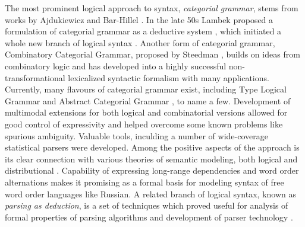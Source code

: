 \documentclass[a4paper]{article}
\theoremstyle{example-style}
\begin{document}
The most prominent logical approach to syntax, \textit{categorial grammar}, stems from works by Ajdukiewicz and Bar-Hillel \parencite{ajdukiewicz1935,bar1953quasi}. In the late 50s Lambek proposed a formulation of categorial grammar as a deductive system \parencite{lambek1958mathematics,lambek1961calculus}, which initiated a whole new branch of logical syntax \parencite{moot2012logic}. Another form of categorial grammar, Combinatory Categorial Grammar, proposed by Steedman \parencite{steedman2000syntactic}, builds on ideas from combinatory logic and has developed into a highly successful non-transformational lexicalized syntactic formalism with many applications. Currently, many flavours of categorial grammar exist, including Type Logical Grammar \parencite{morrill1994type} and Abstract Categorial Grammar \parencite{degroot2001towards}, to name a few. Development of multimodal extensions for both logical and combinatorial versions allowed for good control of expressivity and helped overcome some known problems like spurious ambiguity. Valuable tools, inculding a number of wide-coverage statistical parsers \parencite{curran2007linguistically,white2008open} were developed. Among the positive aspects of the approach is its clear connection with various theories of semantic modeling, both logical \parencite{steedman2000syntactic,bos2008wide,baldridge2002coupling} and distributional \parencite{maillard2014type}. Capability of expressing long-range dependencies and word order alternations makes it promising as a formal basis for modeling syntax of free word order languages like Russian. A related branch of logical syntax, known as \textit{parsing as deduction}, is a set of techniques which proved useful for analysis of formal properties of parsing algorithms and development of parser technology \parencite{pereira1983parsing,kallmeyer2010parsing}.
\end{document}
